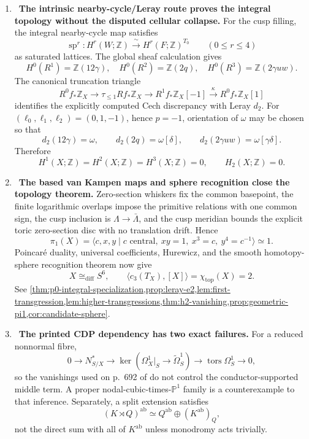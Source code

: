 \begin{enumerate}[leftmargin=1.8em,itemsep=.65em]
\item \Verified\ \textbf{The intrinsic nearby-cycle/Leray route proves the
integral topology without the disputed cellular collapse.}
For the cusp filling, the integral nearby-cycle map satisfies
\[
 \operatorname{sp}^r:H^r(W;\mathbb Z)
   \xrightarrow{\ \sim\ }H^r(F;\mathbb Z)^{T_0}
 \qquad(0\le r\le4)
\]
as saturated lattices.  The global sheaf calculation gives
\[
H^0(R^1)=\mathbb Z(12\gamma),\quad
H^0(R^2)=\mathbb Z(2q),\quad
H^0(R^3)=\mathbb Z(2\gamma uw).
\]
The canonical truncation triangle
\[
 R^0f_*\mathbb Z_X\longrightarrow\tau_{\le1}Rf_*\mathbb Z_X
 \longrightarrow R^1f_*\mathbb Z_X[-1]
 \xrightarrow{\kappa}R^0f_*\mathbb Z_X[1]
\]
identifies the explicitly computed Cech discrepancy with Leray \(d_2\).
For \((\ell_0,\ell_1,\ell_2)=(0,1,-1)\), hence \(p=-1\), orientation of
\(\omega\) may be chosen so that
\[
d_2(12\gamma)=\omega,\qquad
d_2(2q)=\omega[\delta],\qquad
d_2(2\gamma uw)=\omega[\gamma\delta].
\]
Therefore
\[
 H^1(X;\mathbb Z)=H^2(X;\mathbb Z)=H^3(X;\mathbb Z)=0,
 \qquad H_2(X;\mathbb Z)=0.
\]

\item \Verified\ \textbf{The based van Kampen maps and sphere recognition
close the topology theorem.}
Zero-section whiskers fix the common basepoint, the finite logarithmic
overlaps impose the primitive relations with one common sign, the cusp
inclusion is \(\Lambda\to\bar\Lambda\), and the cusp meridian bounds the
explicit toric zero-section disc with no translation drift.  Hence
\[
\pi_1(X)=
\langle c,x,y\mid c\text{ central},\ xy=1,\ x^3=c,\ y^4=c^{-1}\rangle
\simeq1.
\]
Poincar\'e duality, universal coefficients, Hurewicz, and the smooth
homotopy-sphere recognition theorem now give
\[
 X\cong_{\mathrm{diff}}S^6,\qquad
 \langle c_3(T_X),[X]\rangle=\chi_{\mathrm{top}}(X)=2.
\]
See
\cref{thm:p0-integral-specialization,prop:leray-e2,lem:first-transgression,lem:higher-transgressions,thm:h2-vanishing,prop:geometric-pi1,cor:candidate-sphere}.

\item \Refuted\ \textbf{The printed CDP dependency has two exact failures.}
For a reduced nonnormal fibre,
\[
0\longrightarrow N^*_{S/X}\longrightarrow
\ker(\Omega_X^1|_S\to\widetilde\Omega_S^1)
\longrightarrow\operatorname{tors}\Omega_S^1\longrightarrow0,
\]
so the vanishings used on p.~692 of \cite{CDP2020} do not control the
conductor-supported middle term.  A proper
nodal-cubic-times-\(\mathbb P^1\) family is a counterexample to that
inference.  Separately, a split extension satisfies
\[
 (K\rtimes Q)^{\mathrm{ab}}
 \simeq Q^{\mathrm{ab}}\oplus(K^{\mathrm{ab}})_Q,
\]
not the direct sum with all of \(K^{\mathrm{ab}}\) unless monodromy acts
trivially.


\end{enumerate}
